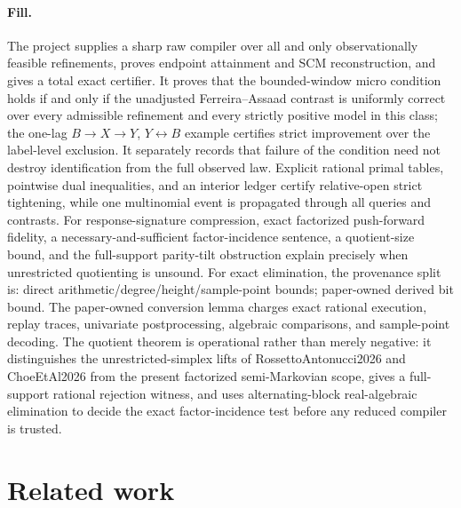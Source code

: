 \documentclass{article}
\begin{document}
\paragraph{Fill.} The project supplies a sharp raw compiler over all and only observationally feasible refinements, proves endpoint attainment and SCM reconstruction, and gives a total exact certifier. It proves that the bounded-window micro condition holds if and only if the unadjusted Ferreira--Assaad contrast is uniformly correct over every admissible refinement and every strictly positive model in this class; the one-lag \(B\to X\to Y\), \(Y\leftrightarrow B\) example certifies strict improvement over the label-level exclusion. It separately records that failure of the condition need not destroy identification from the full observed law. Explicit rational primal tables, pointwise dual inequalities, and an interior ledger certify relative-open strict tightening, while one multinomial event is propagated through all queries and contrasts. For response-signature compression, exact factorized push-forward fidelity, a necessary-and-sufficient factor-incidence sentence, a quotient-size bound, and the full-support parity-tilt obstruction explain precisely when unrestricted quotienting is unsound. For exact elimination, the provenance split is: direct arithmetic/degree/height/sample-point bounds; paper-owned derived bit bound. The paper-owned conversion lemma charges exact rational execution, replay traces, univariate postprocessing, algebraic comparisons, and sample-point decoding. The quotient theorem is operational rather than merely negative: it distinguishes the unrestricted-simplex lifts of RossettoAntonucci2026 and ChoeEtAl2026 from the present factorized semi-Markovian scope, gives a full-support rational rejection witness, and uses alternating-block real-algebraic elimination to decide the exact factor-incidence test before any reduced compiler is trusted.

\section{Related work}
\end{document}
